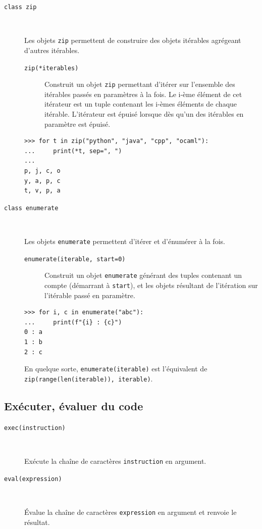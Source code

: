 \documentclass[a4paper, 10pt]{article}
\begin{document}
\begin{description}
    \item[\texttt{class zip}]~
    
    Les objets \texttt{zip} permettent de construire des objets itérables agrégeant d'autres itérables.

    \begin{description}
        \item[\texttt{zip(*iterables)}] Construit un objet \texttt{zip} permettant d'itérer sur l'ensemble des itérables passés en paramètres à la fois. Le i-ème élément de cet itérateur est un tuple contenant les i-èmes éléments de chaque itérable. L'itérateur est épuisé lorsque dès qu'un des itérables en paramètre est épuisé.
    \end{description}

    \begin{verbatim}
>>> for t in zip("python", "java", "cpp", "ocaml"):
...     print(*t, sep=", ")
... 
p, j, c, o
y, a, p, c
t, v, p, a
    \end{verbatim}

    \item[\texttt{class enumerate}]~
    
    Les objets \texttt{enumerate} permettent d'itérer et d'énumérer à la fois.

    \begin{description}
        \item[\texttt{enumerate(iterable, start=0)}] Construit un objet \texttt{enumerate} générant des tuples contenant un compte (démarrant à \texttt{start}), et les objets résultant de l'itération sur l'itérable passé en paramètre.
    \end{description}
    

    \begin{verbatim}
>>> for i, c in enumerate("abc"):
...     print(f"{i} : {c}")
0 : a
1 : b
2 : c
    \end{verbatim}

    En quelque sorte, \texttt{enumerate(iterable)} est l'équivalent de \texttt{zip(range(len(iterable)), iterable)}.

\end{description}

\subsection{Exécuter, évaluer du code}
\begin{description}
    \item[\texttt{exec(instruction)}]~
    
    Exécute la chaîne de caractères \texttt{instruction} en argument.
    
    \item[\texttt{eval(expression)}]~
    
    Évalue la chaîne de caractères \texttt{expression} en argument et renvoie le résultat.
\end{description}
\end{document}
